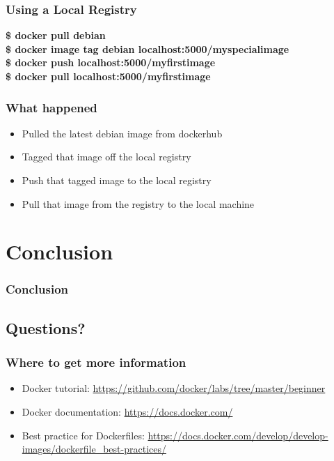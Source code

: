 \documentclass[aspectratio=169,11pt,hyperref={colorlinks=true}]{beamer}
\begin{document}
\begin{frame}
    \frametitle{Using a Local Registry}
    \textbf{\$ docker pull debian} \\
    \textbf{\$ docker image tag debian localhost:5000/myspecialimage} \\
    \textbf{\$ docker push localhost:5000/myfirstimage} \\
    \textbf{\$ docker pull localhost:5000/myfirstimage} 
\end{frame}

\begin{frame}
    \frametitle{What happened}
    \begin{itemize}
        \item Pulled the latest debian image from dockerhub
        \item Tagged that image off the local registry
        \item Push that tagged image to the local registry
        \item Pull that image from the registry to the local machine
    \end{itemize}
\end{frame}

\section{Conclusion}
\begin{frame}
    \frametitle{Conclusion}
\end{frame}

\subsection{Questions?}
\begin{frame}
\frametitle{Where to get more information}
    \begin{itemize}
        \item Docker tutorial: \href{https://github.com/docker/labs/tree/master/beginner}{https://github.com/docker/labs/tree/master/beginner}
        \item Docker documentation: \href{https://docs.docker.com/}{https://docs.docker.com/}
        \item Best practice for Dockerfiles: \href{https://docs.docker.com/develop/develop-images/dockerfile\_best-practices/}{https://docs.docker.com/develop/develop-images/dockerfile\_best-practices/}
    \end{itemize}
\end{frame}
\end{document}
